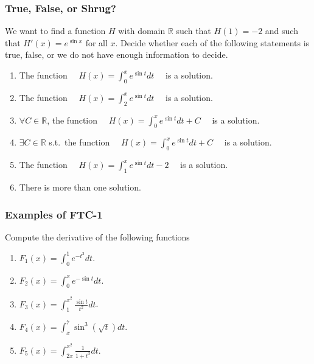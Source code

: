 \begin{frame}[t]
	\fontsize{11}{11}\selectfont
	\frametitle{True, False, or Shrug?}

	We want to find a function $H$ with domain $\mathbb{R}$ such that $\displaystyle
	H(1) = -2$ and such that $\displaystyle H'(x) = e^{\sin x}$ for all $x$.
	Decide whether each of the following statements is true, false, or we do not
	have enough information to decide.

	\begin{enumerate}
		\item The function $\displaystyle \quad H(x) = \int_{0}^{x}e^{\sin t}dt \quad$
			is a solution.

		\item The function $\displaystyle \quad H(x) = \int_{2}^{x}e^{\sin t}dt \quad$
			is a solution.

		\item $\forall C \in \mathbb{R}$, the function
			$\displaystyle \quad H(x) = \int_{0}^{x}e^{\sin t}dt + C \quad$ is a
			solution.

		\item $\exists C \in \mathbb{R}$ s.t.\ the function
			$\displaystyle \quad H(x) = \int_{0}^{x}e^{\sin t}dt + C \quad$ is a
			solution.

		\item The function $\displaystyle \quad H(x) = \int_{1}^{x}e^{\sin t}dt -2 \quad$
			is a solution.

		\item There is more than one solution.
	\end{enumerate}
\end{frame}

\begin{frame}[t]
	\fontsize{13}{13}\selectfont
	\frametitle{Examples of FTC-1}

	Compute the derivative of the following functions

	\begin{enumerate}
		\item $\displaystyle F_{1}(x) = \int_{0}^{1}e^{-t^2}dt$. \\
			\vfill

		\item $\displaystyle F_{2}(x) = \int_{0}^{x}e^{-\sin t}dt$. \\
			\vfill

		\item $\displaystyle F_{3}(x) = \int_{1}^{x^2}\frac{\sin t}{t^{2}}dt$. \\
			\vfill

		\item $\displaystyle F_{4}(x) = \! \int_{x}^{7}\sin^{3}\! \! \left( \sqrt{t}\right
			) \! dt$. \\
			\vfill

		\item $\displaystyle F_{5}(x) = \int_{2x}^{x^2}\frac{1}{1+t^{3}}dt$. \\
	\end{enumerate}
\end{frame}

